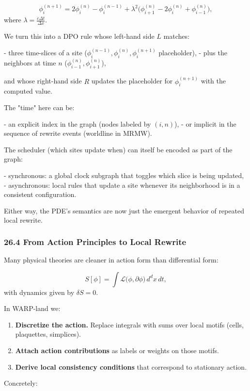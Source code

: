 \[
  \phi_i^{(n+1)} = 2\phi_i^{(n)} - \phi_i^{(n-1)} + \lambda^2 \big(\phi_{i+1}^{(n)} - 2\phi_i^{(n)} + \phi_{i-1}^{(n)}\big),
\]
where $\lambda = \frac{c \Delta t}{\Delta x}$.

We turn this into a DPO rule whose left-hand side $L$ matches:

- three time-slices of a site ($\phi_i^{(n-1)}, \phi_i^{(n)}, \phi_i^{(n+1)}$ placeholder),
- plus the neighbors at time $n$ ($\phi_{i-1}^{(n)}, \phi_{i+1}^{(n)}$),

and whose right-hand side $R$ updates the placeholder for $\phi_i^{(n+1)}$ with the computed value.

The "time" here can be:

- an explicit index in the graph (nodes labeled by $(i,n)$),
- or implicit in the sequence of rewrite events (worldline in MRMW).

The scheduler (which sites update when) can itself be encoded as part of the graph:

- synchronous: a global clock subgraph that toggles which slice is being updated,
- asynchronous: local rules that update a site whenever its neighborhood is in a consistent configuration.

Either way, the PDE’s semantics are now just the emergent behavior of repeated local rewrite.

\subsubsection*{26.4  From Action Principles to Local Rewrite}

Many physical theories are cleaner in action form than differential form:

\[
  S[\phi] = \int \mathcal{L}\big(\phi, \partial \phi\big) \, d^dx\, dt,
\]
with dynamics given by $\delta S = 0$.

In WARP-land we:

\begin{enumerate}
  \item \textbf{Discretize the action.} Replace integrals with sums over local motifs (cells, plaquettes, simplices).
  \item \textbf{Attach action contributions} as labels or weights on those motifs.
  \item \textbf{Derive local consistency conditions} that correspond to stationary action.
\end{enumerate}

Concretely:

